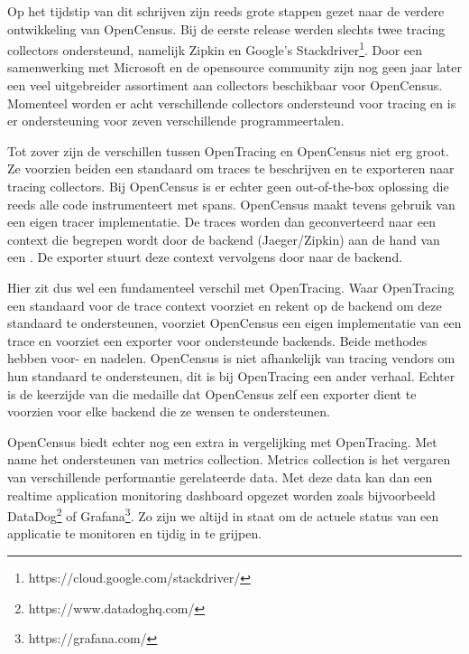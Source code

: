 Op het tijdstip van dit schrijven zijn reeds grote stappen gezet naar de verdere ontwikkeling van OpenCensus. Bij de eerste release werden slechts twee tracing collectors ondersteund, namelijk Zipkin en Google's Stackdriver\footnote{https://cloud.google.com/stackdriver/}. Door een samenwerking met Microsoft en de opensource community zijn nog geen jaar later een veel uitgebreider assortiment aan collectors beschikbaar voor OpenCensus. Momenteel worden er acht verschillende collectors ondersteund voor tracing en is er ondersteuning voor zeven verschillende programmeertalen.

Tot zover zijn de verschillen tussen OpenTracing en OpenCensus niet erg groot. Ze voorzien beiden een standaard om traces te beschrijven en te exporteren naar tracing collectors. Bij OpenCensus is er echter geen out-of-the-box oplossing die reeds alle code instrumenteert met spans. OpenCensus maakt tevens gebruik van een eigen tracer implementatie. De traces worden dan geconverteerd naar een context die begrepen wordt door de backend (Jaeger/Zipkin) aan de hand van een . De exporter stuurt deze context vervolgens door naar de backend.

Hier zit dus wel een fundamenteel verschil met OpenTracing. Waar OpenTracing een standaard voor de trace context voorziet en rekent op de backend om deze standaard te ondersteunen, voorziet OpenCensus een eigen implementatie van een trace en voorziet een exporter voor ondersteunde backends. Beide methodes hebben voor- en nadelen. OpenCensus is niet afhankelijk van tracing vendors om hun standaard te ondersteunen, dit is bij OpenTracing een ander verhaal. Echter is de keerzijde van die medaille dat OpenCensus zelf een exporter dient te voorzien voor elke backend die ze wensen te ondersteunen.


OpenCensus biedt echter nog een extra in vergelijking met OpenTracing. Met name het ondersteunen van metrics collection. Metrics collection is het vergaren van verschillende performantie gerelateerde data. Met deze data kan dan een realtime application monitoring dashboard opgezet worden zoals bijvoorbeeld DataDog\footnote{https://www.datadoghq.com/} of Grafana\footnote{https://grafana.com/}. Zo zijn we altijd in staat om de actuele status van een applicatie te monitoren en tijdig in te grijpen.

